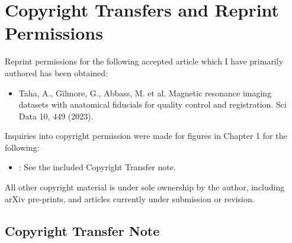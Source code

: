 \chapter{Copyright Transfers and Reprint Permissions}\label{app:copyright}
\newpage
Reprint permissions for the following accepted article which I have primarily authored has
been obtained:
\begin{itemize}
	\item Taha, A., Gilmore, G., Abbass, M. et al. Magnetic resonance imaging datasets with anatomical fiducials for quality control and registration. Sci Data 10, 449 (2023).
\end{itemize}

Inquiries into copyright permission were made for figures in Chapter 1 for the following:
\begin{itemize}
	\item \cite{Horn2018-qq}: See the included Copyright Transfer note.
\end{itemize}

All other copyright material is under sole ownership by the author, including arXiv pre-prints, and articles currently under submission or revision.
\newpage
\section{Copyright Transfer Note \cite{Horn2018-qq}}

